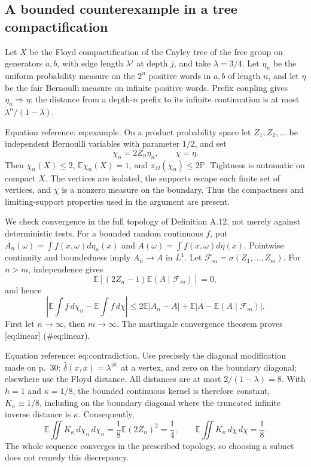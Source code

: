\documentclass[10pt]{article}
\begin{document}
\subsection*{A bounded counterexample in a tree compactification}
Let \(X\) be the Floyd compactification of the Cayley tree of the free group on generators \(a,b\), with edge length \(\lambda^j\) at depth \(j\), and take \(\lambda=3/4\). Let \(\eta_n\) be the uniform probability measure on the \(2^n\) positive words in \(a,b\) of length \(n\), and let \(\eta\) be the fair Bernoulli measure on infinite positive words. Prefix coupling gives \(\eta_n\Rightarrow\eta\): the distance from a depth-\(n\) prefix to its infinite continuation is at most \(\lambda^n/(1-\lambda)\).\par
Equation reference: eq:example. On a product probability space let \(Z_1,Z_2,\ldots\) be independent Bernoulli variables with parameter \(1/2\), and set \[
 \chi_n=2Z_n\eta_n,\qquad \chi=\eta .\] Then \(\chi_n(X)\leq2\), \(\mathbb E\chi_n(X)=1\), and \(\pi_\Omega(\chi_n)\leq2\mathbb P\). Tightness is automatic on compact \(X\). The vertices are isolated, the supports escape each finite set of vertices, and \(\chi\) is a nonzero measure on the boundary. Thus the compactness and limiting-support properties used in the argument are present.\par
We check convergence in the full topology of Definition A.12, not merely against deterministic tests. For a bounded random continuous \(f\), put \(A_n(\omega)=\int f(x,\omega)d\eta_n(x)\) and \(A(\omega)=\int f(x,\omega)d\eta(x)\). Pointwise continuity and boundedness imply \(A_n\to A\) in \(L^1\). Let \(\mathcal F_m=\sigma(Z_1,\ldots,Z_m)\). For \(n>m\), independence gives \[\mathbb E[(2Z_n-1)\mathbb E(A\mid\mathcal F_m)]=0,\] and hence \[\left|\mathbb E\int f\,d\chi_n-\mathbb E\int f\,d\chi\right|
 \leq2\mathbb E|A_n-A|+\mathbb E|A-\mathbb E(A\mid\mathcal F_m)|.\] First let \(n\to\infty\), then \(m\to\infty\). The martingale convergence theorem proves [eq:linear] (\#eq:linear).\par
Equation reference: eq:contradiction. Use precisely the diagonal modification made on p. 30: \(\widehat\delta(x,x)=\lambda^{|x|}\) at a vertex, and zero on the boundary diagonal; elsewhere use the Floyd distance. All distances are at most \(2/(1-\lambda)=8\). With \(h=1\) and \(\kappa=1/8\), the bounded continuous kernel is therefore constant, \(K_\kappa\equiv1/8\), including on the boundary diagonal where the truncated infinite inverse distance is \(\kappa\). Consequently, \[
 \mathbb E\iint K_\kappa\,d\chi_n\,d\chi_n
   =\frac18\mathbb E(2Z_n)^2=\frac14,\qquad
 \mathbb E\iint K_\kappa\,d\chi\,d\chi=\frac18.\] The whole sequence converges in the prescribed topology, so choosing a subnet does not remedy this discrepancy.\par
\end{document}
